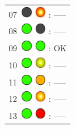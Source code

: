 \documentclass[12pt, a4paper]{report}
\begin{document}
\begin{minipage}{0.45\textwidth}
\begin{Large}
\begin{tabular}{l}
		07\  \includegraphics*[width=5mm]{off_led} \includegraphics*[width=5mm]{red_led_flashing} : -----\\
		
		08\  \includegraphics*[width=5mm]{green_led} \includegraphics*[width=5mm]{off_led} : -----\\
		
		09\  \includegraphics*[width=5mm]{green_led} \includegraphics*[width=5mm]{green_led} : OK\\
		
		10\  \includegraphics*[width=5mm]{green_led} \includegraphics*[width=5mm]{green_led_flashing} : -----\\
		
		11\  \includegraphics*[width=5mm]{green_led} \includegraphics*[width=5mm]{orange_led} : -----\\
		
		12\  \includegraphics*[width=5mm]{green_led} \includegraphics*[width=5mm]{orange_led_flashing} : -----\\
		
		13\  \includegraphics*[width=5mm]{green_led} \includegraphics*[width=5mm]{red_led} : -----\\
		

\end{tabular}
\end{Large}
\end{minipage}
\end{document}

